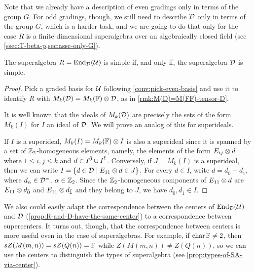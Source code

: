 
Note that we already have a description of even gradings only in terms of the group $G$. 
For odd gradings, though, we still need to describe $\mathcal{D}$ only in terms of the group $G$, which is a harder task, and we are going to do that only for the case $R$ is a finite dimensional superalgebra over an algebraically closed field (see \cref{ssec:T-beta-p,sec:assc-only-G}).
 
\begin{prop}\label{prop:simple-R-D-super}
	The superalgebra $R = \operatorname{End}_{\mathcal{D}} (\mathcal U)$ is simple if, and only if, the superalgebra $\mathcal{D}$ is simple.
\end{prop}

\begin{proof}
    Pick a graded basis for $\mathcal U$ following \cref{conv:pick-even-basis} and use it to identify $R$ with $M_k(\mathcal{D}) = M_k(\mathbb{F}) \otimes \mathcal{D}$, as in \cref{rmk:M(D)=M(FF)-tensor-D}.

	It is well known that the ideals of $M_k(\mathcal{D})$ are precisely the sets of the form $M_k(I)$ for $I$ an ideal of $\mathcal{D}$.
	We will prove an analog of this for superideals.

	If $I$ is a superideal, $M_k(I) = M_k(\mathbb{F}) \otimes I$ is also a superideal since it is spanned by a set of $\mathbb{Z}_2$-homogeneous elements, namely, the elements of the form $E_{ij}\otimes d$ where $1 \leq i,j \leq k$ and $d \in I^{\bar0} \cup I^{\bar1}$.
	Conversely, if $J = M_k(I)$ is a superideal, then we can write $I = \{ d\in  \mathcal{D} \mid E_{11}\otimes d \in J\}$.
	For every $d\in I$, write $d = d_{\bar 0} + d_{\bar 1}$, where $d_\alpha \in \mathcal{D}^\alpha$, $\alpha \in \mathbb{Z}_2$.
	Since the $\mathbb{Z}_2$-homogeneous components of $E_{11}\otimes d$ are $E_{11}\otimes d_{\bar 0}$ and $E_{11}\otimes d_{\bar 1}$ and they belong to $J$, we have $d_{\bar 0}, d_{\bar 1} \in I$.
\end{proof}

We also could easily adapt the correspondence between the centers of $\operatorname{End}_{\mathcal{D}} (\mathcal U)$ and $\mathcal{D}$ (\cref{prop:R-and-D-have-the-same-center}) to a correspondence between supercenters. 
It turns out, though, that the correspondence between centers is more useful even in the case of superalgebras. 
For example, if $\operatorname{char} \mathbb{F} \neq 2$, then $sZ(M(m,n)) = sZ(Q(n)) = \mathbb{F}$ while $Z(M(m,n)) \neq Z(Q(n))$, so we can use the centers to distinguish the types of superalgebra (see \cref{prop:types-of-SA-via-center}). 

